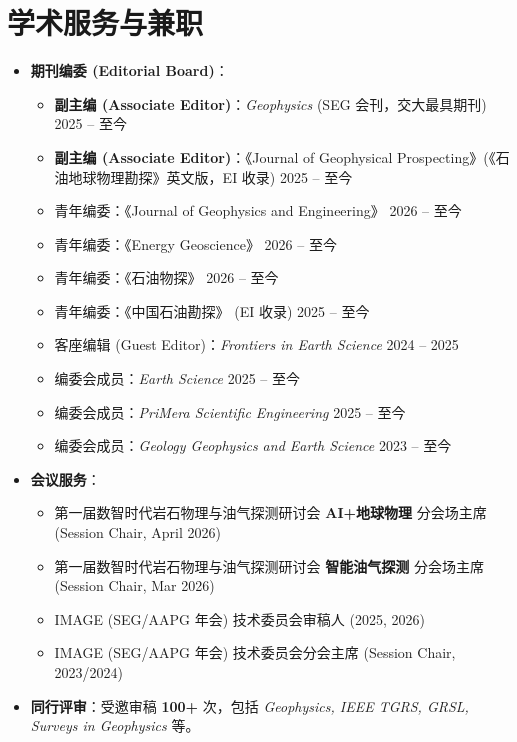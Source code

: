 \documentclass[11pt,a4paper]{article}
\begin{document}
\section{学术服务与兼职}
\begin{itemize}
    \item \textbf{期刊编委 (Editorial Board)}：
    \begin{itemize}
        \item \textbf{副主编 (Associate Editor)}：\textit{Geophysics} (SEG 会刊，交大最具期刊) \hfill 2025 -- 至今
        \item \textbf{副主编 (Associate Editor)}：《Journal of Geophysical Prospecting》(《石油地球物理勘探》英文版，EI 收录) \hfill 2025 -- 至今
        \item 青年编委：《Journal of Geophysics and Engineering》 \hfill 2026 -- 至今
        \item 青年编委：《Energy Geoscience》 \hfill 2026 -- 至今
        \item 青年编委：《石油物探》 \hfill 2026 -- 至今
        \item 青年编委：《中国石油勘探》  (EI 收录) \hfill 2025 -- 至今
        \item 客座编辑 (Guest Editor)：\textit{Frontiers in Earth Science} \hfill 2024 -- 2025
        \item 编委会成员：\textit{Earth Science}  \hfill 2025 -- 至今
        \item 编委会成员：\textit{PriMera Scientific Engineering}  \hfill 2025 -- 至今
        \item 编委会成员：\textit{Geology Geophysics and Earth Science}  \hfill 2023 -- 至今
    \end{itemize}
    \item \textbf{会议服务}：
        \begin{itemize}
        \item 第一届数智时代岩石物理与油气探测研讨会 \textbf{AI+地球物理} 分会场主席 (Session Chair, April 2026)
        \item 第一届数智时代岩石物理与油气探测研讨会 \textbf{智能油气探测} 分会场主席 (Session Chair, Mar 2026)
        \item IMAGE (SEG/AAPG 年会) 技术委员会审稿人 (2025, 2026)
        \item IMAGE (SEG/AAPG 年会) 技术委员会分会主席 (Session Chair, 2023/2024)
    \end{itemize}
    \item \textbf{同行评审}：受邀审稿 \textbf{100+} 次，包括 \textit{Geophysics, IEEE TGRS, GRSL, Surveys in Geophysics} 等。
\end{itemize}
\end{document}
